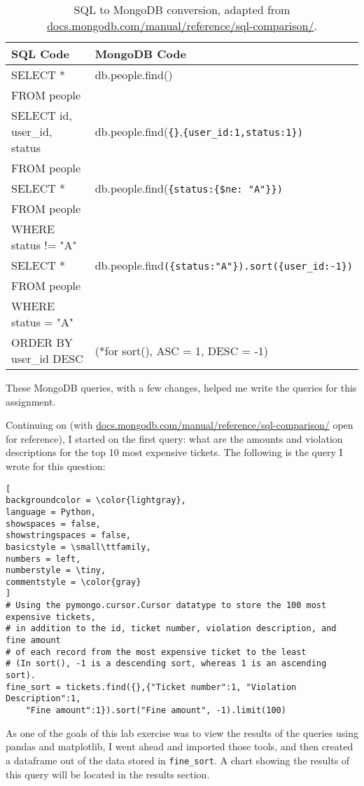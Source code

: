 \documentclass[]{article}
\newcommand{\code}[1]{\colorbox{light-gray}{\texttt{#1}}}
\begin{document}
\begin{table}[!ht]
	\begin{center}
		\caption{SQL to MongoDB conversion, adapted from \url{docs.mongodb.com/manual/reference/sql-comparison/}.}
		\label{tab:table1}
		\begin{tabular}{|l|l|} 
			\hline
			\textbf{SQL Code} & \textbf{MongoDB Code}\\
			\hline
			SELECT *  & db.people.find() \\
			FROM people & \\
			\hline
			SELECT id,
				user\_id,
				status& db.people.find(\verb|{}|,\verb|{user_id:1,status:1})|\\
			FROM people &  \\
			\hline
			SELECT * & db.people.find(\verb|{status:{$ne: "A"}})|\\
			FROM people & \\
			WHERE status != "A" & \\
			\hline
			SELECT * & db.people.find\verb|({status:"A"}).sort({user_id:-1})| \\
			FROM people &  \\
			WHERE status = "A" &  \\
			ORDER BY user\_id DESC& (*for sort(), ASC = 1, DESC = -1)\\
			\hline
		\end{tabular}
	\end{center}
\end{table}

These MongoDB queries, with a few changes, helped me write the queries for this assignment.

Continuing on (with \url{docs.mongodb.com/manual/reference/sql-comparison/} open for reference), I started on the first query: what are the amounts and violation descriptions for the top 10 most expensive tickets.
The following is the query I wrote for this question:

\begin{lstlisting}[
backgroundcolor = \color{lightgray},
language = Python,
showspaces = false,
showstringspaces = false,
basicstyle = \small\ttfamily,
numbers = left,
numberstyle = \tiny,
commentstyle = \color{gray}
]
# Using the pymongo.cursor.Cursor datatype to store the 100 most expensive tickets, 
# in addition to the id, ticket number, violation description, and fine amount
# of each record from the most expensive ticket to the least
# (In sort(), -1 is a descending sort, whereas 1 is an ascending sort).
fine_sort = tickets.find({},{"Ticket number":1, "Violation Description":1, 
	"Fine amount":1}).sort("Fine amount", -1).limit(100)

\end{lstlisting}
As one of the goals of this lab exercise was to view the results of the queries using pandas and matplotlib,
I went ahead and imported those tools, and then created a dataframe out of the data stored in \code{fine\_sort}.  A chart showing the results of this query will be located in the results section.
\end{document}
